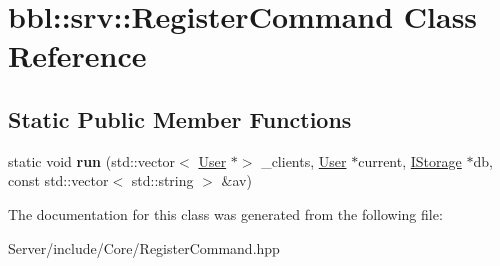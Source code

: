 \hypertarget{classbbl_1_1srv_1_1_register_command}{}\section{bbl\+:\+:srv\+:\+:Register\+Command Class Reference}
\label{classbbl_1_1srv_1_1_register_command}
\subsection*{Static Public Member Functions}
\begin{DoxyCompactItemize}
\item 
\mbox{\label{classbbl_1_1srv_1_1_register_command_a6ce7258c3ba03021be83931e1df9b6ae}} 
static void {\bfseries run} (std\+::vector$<$ \hyperlink{classbbl_1_1srv_1_1_user}{User} $\ast$$>$ \+\_\+clients, \hyperlink{classbbl_1_1srv_1_1_user}{User} $\ast$current, \hyperlink{classbbl_1_1srv_1_1_i_storage}{I\+Storage} $\ast$db, const std\+::vector$<$ std\+::string $>$ \&av)
\end{DoxyCompactItemize}


The documentation for this class was generated from the following file\+:\begin{DoxyCompactItemize}
\item 
Server/include/\+Core/Register\+Command.\+hpp\end{DoxyCompactItemize}
